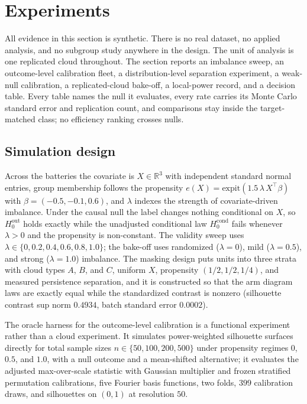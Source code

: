 \section{Experiments}
\label{sec:experiments}

All evidence in this section is synthetic. There is no real dataset, no applied analysis, and no subgroup study anywhere in the design. The unit of analysis is one replicated cloud throughout. The section reports an imbalance sweep, an outcome-level calibration fleet, a distribution-level separation experiment, a weak-null calibration, a replicated-cloud bake-off, a local-power record, and a decision table. Every table names the null it evaluates, every rate carries its Monte Carlo standard error and replication count, and comparisons stay inside the target-matched class; no efficiency ranking crosses nulls.

\subsection{Simulation design}
\label{sec:exp:design}

Across the batteries the covariate is $X \in \mathbb{R}^3$ with independent standard normal entries, group membership follows the propensity $e(X) = \mathrm{expit}(1.5\,\lambda\,X^{\top}\beta)$ with $\beta = (-0.5,-0.1,0.6)$, and $\lambda$ indexes the strength of covariate-driven imbalance. Under the causal null the label changes nothing conditional on $X$, so $H_0^{\mathrm{out}}$ holds exactly while the unadjusted conditional law $H_0^{\mathrm{cond}}$ fails whenever $\lambda>0$ and the propensity is non-constant. The validity sweep uses $\lambda \in \{0,0.2,0.4,0.6,0.8,1.0\}$; the bake-off uses randomized ($\lambda=0$), mild ($\lambda=0.5$), and strong ($\lambda=1.0$) imbalance. The masking design puts units into three strata with cloud types $A$, $B$, and $C$, uniform $X$, propensity $(1/2,1/2,1/4)$, and measured persistence separation, and it is constructed so that the arm diagram laws are exactly equal while the standardized contrast is nonzero (silhouette contrast sup norm $0.4934$, batch standard error $0.0002$).

The oracle harness for the outcome-level calibration is a functional experiment rather than a cloud experiment. It simulates power-weighted silhouette surfaces directly for total sample sizes $n \in \{50,100,200,500\}$ under propensity regimes $0$, $0.5$, and $1.0$, with a null outcome and a mean-shifted alternative; it evaluates the adjusted max-over-scale statistic with Gaussian multiplier and frozen stratified permutation calibrations, five Fourier basis functions, two folds, $399$ calibration draws, and silhouettes on $(0,1)$ at resolution $50$.


